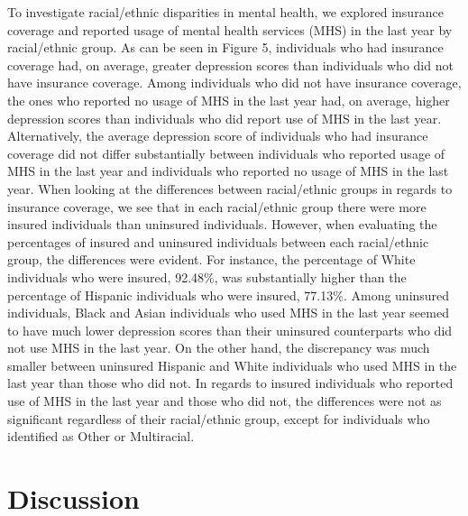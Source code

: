 \documentclass[man]{apa6}
\begin{document}
To investigate racial/ethnic disparities in mental health, we explored
insurance coverage and reported usage of mental health services (MHS) in
the last year by racial/ethnic group. As can be seen in Figure 5,
individuals who had insurance coverage had, on average, greater
depression scores than individuals who did not have insurance coverage.
Among individuals who did not have insurance coverage, the ones who
reported no usage of MHS in the last year had, on average, higher
depression scores than individuals who did report use of MHS in the last
year. Alternatively, the average depression score of individuals who had
insurance coverage did not differ substantially between individuals who
reported usage of MHS in the last year and individuals who reported no
usage of MHS in the last year. When looking at the differences between
racial/ethnic groups in regards to insurance coverage, we see that in
each racial/ethnic group there were more insured individuals than
uninsured individuals. However, when evaluating the percentages of
insured and uninsured individuals between each racial/ethnic group, the
differences were evident. For instance, the percentage of White
individuals who were insured, 92.48\%, was substantially higher than the
percentage of Hispanic individuals who were insured, 77.13\%. Among
uninsured individuals, Black and Asian individuals who used MHS in the
last year seemed to have much lower depression scores than their
uninsured counterparts who did not use MHS in the last year. On the
other hand, the discrepancy was much smaller between uninsured Hispanic
and White individuals who used MHS in the last year than those who did
not. In regards to insured individuals who reported use of MHS in the
last year and those who did not, the differences were not as significant
regardless of their racial/ethnic group, except for individuals who
identified as Other or Multiracial.

\section{Discussion}\label{discussion}
\end{document}
